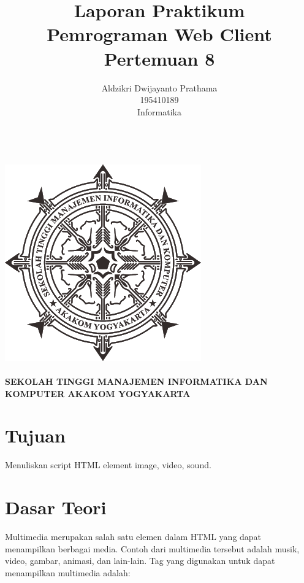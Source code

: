 \documentclass[a4paper,12pt]{article}
\begin{document}
\title{ {\Large Laporan Praktikum}\\ Pemrograman Web Client\\{\Large Pertemuan 8}}

\author{Aldzikri Dwijayanto Prathama 
	\\195410189
	\\Informatika}
\makeatletter
\begin{titlepage}
	\begin{center}
		{\huge \bfseries \@title }\\[14ex]
		\includegraphics[scale=.8]{logo}\\[4ex]
		{\large \@author}\\[12ex]
		{\large \bfseries {SEKOLAH TINGGI MANAJEMEN INFORMATIKA DAN KOMPUTER
				AKAKOM YOGYAKARTA}}
	\end{center}


\end{titlepage}
\makeatother
\renewcommand{\figurename}{Gambar}
\newpage
\tableofcontents
\newpage
\section{Tujuan}
Menuliskan script HTML element image, video, sound.
\section{Dasar Teori}
Multimedia merupakan salah satu elemen dalam HTML yang dapat menampilkan berbagai media. Contoh dari multimedia tersebut
adalah musik, video, gambar, animasi, dan lain-lain. Tag yang digunakan untuk dapat menampilkan multimedia adalah:
\end{document}
